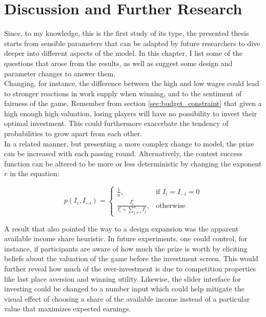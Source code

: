 \thispagestyle{fancy}
\chapter{Discussion and Further Research}
\label{ch:discussion}

Since, to my knowledge, this is the first study of its type, the presented thesis starts from sensible parameters that can be adapted by future researchers to dive deeper into different aspects of the model. In this chapter, I list some of the questions that arose from the results, as well as suggest some design and parameter changes to answer them.\\

Changing, for instance, the difference between the high and low wages could lead to stronger reactions in work supply when winning, and to the sentiment of fairness of the game. Remember from section \ref{sec:budget_constraint} that given a high enough high valuation, losing players will have no possibility to invest their optimal investment. This could furthermore exacerbate the tendency of probabilities to grow apart from each other.\\

In a related manner, but presenting a more complex change to model, the prize can be increased with each passing round. Alternatively, the contest success function can be altered to be more or less deterministic by changing the exponent $r$ in the equation:

\begin{equation}
    p(I_i,I_{-i}) =
\begin{cases}
    \frac{1}{n},& \text{if } I_i = I_{-i} = 0\\
    \frac{I_i^r}{I_i^r + \sum_{j\neq i}^n I_{j}^r},              & \text{otherwise}
\end{cases}
\label{eq:csf_exp}    
\end{equation}

A result that also pointed the way to a design expansion was the apparent available income share heuristic. In future experiments, one could control, for instance, if participants are aware of how much the prize is worth by eliciting beliefs about the valuation of the game before the investment screen. This would further reveal how much of the over-investment is due to competition properties like last place aversion and winning utility. Likewise, the slider interface for investing could be changed to a number input which could help mitigate the visual effect of choosing a share of the available income instead of a particular value that maximizes expected earnings.\\

